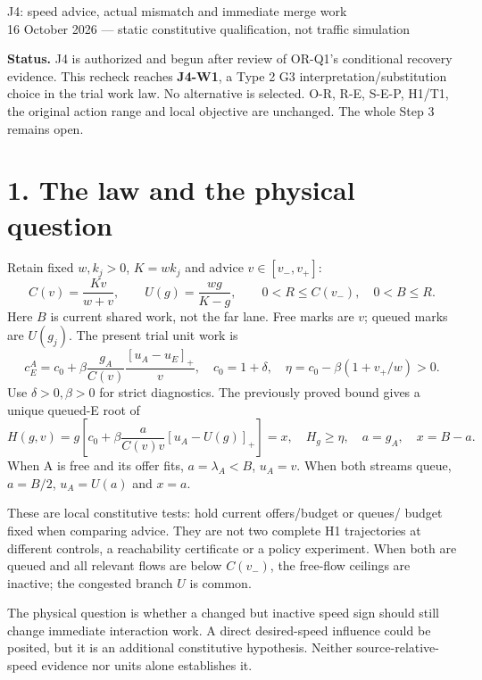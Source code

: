 \documentclass[11pt,a4paper]{article}
\newcommand{\pos}[1]{[#1]_+}
\begin{document}
\begin{center}
{\Large J4: speed advice, actual mismatch and immediate merge work}\\[4pt]
16 October 2026 --- static constitutive qualification, not traffic simulation
\end{center}

\textbf{Status.} J4 is authorized and begun after review of OR-Q1's
conditional recovery evidence. This recheck reaches \textbf{J4-W1}, a
Type 2 G3 interpretation/substitution choice in the trial work law. No
alternative is selected. O-R, R-E, S-E-P, H1/T1, the original action range
and local objective are unchanged. The whole Step 3 remains open.

\section*{1. The law and the physical question}
Retain fixed $w,k_j>0$, $K=wk_j$ and advice $v\in[v_-,v_+]$:
\begin{equation}
C(v)=\frac{Kv}{w+v},\qquad U(g)=\frac{wg}{K-g},\qquad
0<R\leq C(v_-),\quad 0<B\leq R.\tag{1}
\end{equation}
Here $B$ is current shared work, not the far lane. Free marks are $v$;
queued marks are $U(g_j)$. The present trial unit work is
\begin{equation}
c_E^{A}=c_0+\beta\frac{g_A}{C(v)}\frac{\pos{u_A-u_E}}v,
\quad c_0=1+\delta,\quad
\eta=c_0-\beta(1+v_+/w)>0.\tag{2}
\end{equation}
Use $\delta>0,\beta>0$ for strict diagnostics. The previously proved
bound gives a unique queued-E root of
\begin{equation}
H(g,v)=g\left[c_0+\beta\frac{a}{C(v)v}
                      \pos{u_A-U(g)}\right]=x,\quad H_g\geq\eta,
\quad a=g_A,\quad x=B-a.\tag{3}
\end{equation}
When A is free and its offer fits, $a=\lambda_A<B$, $u_A=v$.
When both streams queue, $a=B/2$, $u_A=U(a)$ and $x=a$.

These are local constitutive tests: hold current offers/budget or queues/
budget fixed when comparing advice. They are not two complete H1 trajectories
at different controls, a reachability certificate or a policy experiment.
When both are queued and all relevant flows are below $C(v_-)$, the
free-flow ceilings are inactive; the congested branch $U$ is common.

The physical question is whether a changed but inactive speed sign should
still change immediate interaction work. A direct desired-speed influence
could be posited, but it is an additional constitutive hypothesis. Neither
source-relative-speed evidence nor units alone establishes it.
\end{document}
